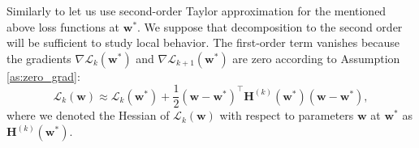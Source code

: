 \documentclass{article}
\begin{document}
Similarly to \cite{kiselev2024unraveling} let us use second-order Taylor approximation for the mentioned above loss functions at \(\mathbf{w}^*\). We suppose that decomposition to the second order will be sufficient to study local behavior. The first-order term vanishes because the gradients \(\nabla \mathcal{L}_{k}(\mathbf{w}^*)\) and \(\nabla \mathcal{L}_{k+1}(\mathbf{w}^*)\) are zero according to Assumption \ref{as:zero_grad}:
\begin{equation}\label{eq:approx}
    \mathcal{L}_{k}(\mathbf{w}) \approx \mathcal{L}_{k}(\mathbf{w}^*) + \dfrac{1}{2} (\mathbf{w} - \mathbf{w}^*)^\top \mathbf{H}^{(k)}(\mathbf{w}^*) (\mathbf{w} - \mathbf{w}^*),
\end{equation}
where we denoted the Hessian of \(\mathcal{L}_{k}(\mathbf{w})\) with respect to parameters \(\mathbf{w}\) at \(\mathbf{w}^*\) as \(\mathbf{H}^{(k)}(\mathbf{w}^*)\). 
\end{document}
